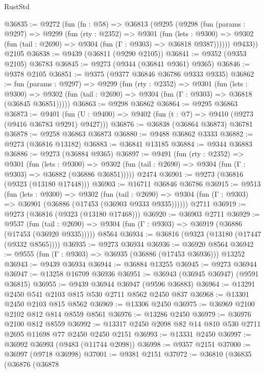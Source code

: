 \begin{lexlean}{RustStd}
\begin{coremodule}
@36835 := @9272
    (fun (fn : @58) =>
    @36813
      (@9295
        (@9298
          (fun (params : @9297) =>
          @9299
            (fun (rty : @2352) =>
            @9301
              (fun (lets : @9300) =>
              @9302 (fun (tail : @2690) => @9304 (fun (Γ : @9303) => @36818 @9387))))))
        @9433))
    @2105
@36838 := @9439 (@36811 (@9290 @2105))
@36841 := @9352 (@9353 @2105) @36783
@36845 := @9273 (@9344 (@36841 @9361) @9365)
@36846 := @9378 @2105
@36851 := @9375 (@9377 @36846 @36786 @9333 @9335)
@36862 := fun (params : @9297) =>
  @9299
    (fun (rty : @2352) =>
    @9301
      (fun (lets : @9300) =>
      @9302 (fun (tail : @2690) => @9304 (fun (Γ : @9303) => @36818 (@36845 @36851)))))
@36863 := @9298 @36862
@36864 := @9295 @36863
@36873 := @9401
    (fun (U : @9400) => @9402 (fun (t : @7) => @9410 (@9273 (@9416 @36783 @9291) @9427)))
@36876 := @36838 (@36864 @36873) @36781
@36878 := @9258 @36863 @36873
@36880 := @9488 @36862 @3333
@36882 := @9273 (@36816 @13182)
@36883 := @36841 @13185
@36884 := @9344 @36883
@36886 := @9273 (@36884 @9365)
@36897 := @9491
    (fun (rty : @2352) =>
    @9301
      (fun (lets : @9300) =>
      @9302 (fun (tail : @2690) => @9304 (fun (Γ : @9303) => @36882 (@36886 @36851)))))
    @2474
@36901 := @9273 (@36816 (@9323 (@13180 @17448)))
@36903 := @16711 @36846 @36786
@36915 := @9513
    (fun (lets : @9300) =>
    @9302
      (fun (tail : @2690) =>
      @9304 (fun (Γ : @9303) => @36901 (@36886 (@17453 (@36903 @9333 @9335))))))
    @2711
@36919 := @9273 (@36816 (@9323 (@13180 @17468)))
@36920 := @36903 @2711
@36929 := @9537
    (fun (tail : @2690) => @9304 (fun (Γ : @9303) => @36919 (@36886 (@17453 (@36920 @9335)))))
    @8564
@36934 := @36816 (@9323 (@13180 (@17447 (@9332 @8565))))
@36935 := @9273 @36934
@36936 := @36920 @8564
@36942 := @9555 (fun (Γ : @9303) => @36935 (@36886 (@17453 @36936))) @13252
@36943 := @9439 @36934
@36944 := @36884 @13255
@36945 := @9273 @36944
@36947 := @13258 @16709 @36936
@36951 := @36943 (@36945 @36947) (@9591 @36815)
@36955 := @9439 @36944 @36947 (@9596 @36883)
@36964 := @13291 @2450 @541 @2103 @815 @530 @2711 @8562 @2450 @837
@36968 := @13301 @2450 @2103 @815 @8562
@36969 := @13306 @2450
@36975 := @36969 @2100 @2102 @812 @814 @8559 @8561
@36976 := @13286 @2450
@36979 := @36976 @2100 @812 @8559
@36992 := @13317 @2450 @2098 @82 @14 @810 @530 @2711 @2695 @11698 @77 @2450 @2450 @2151
@36993 := @13331 @2450
@36997 := @36992 @36993 (@9483 (@11744 @2098))
@36998 := @9357 @2151
@37000 := @36997 (@9718 @36998)
@37001 := @9381 @2151
@37072 := @36810
    (@36835
      (@36876
        (@36878

\end{coremodule}
\end{lexlean}
